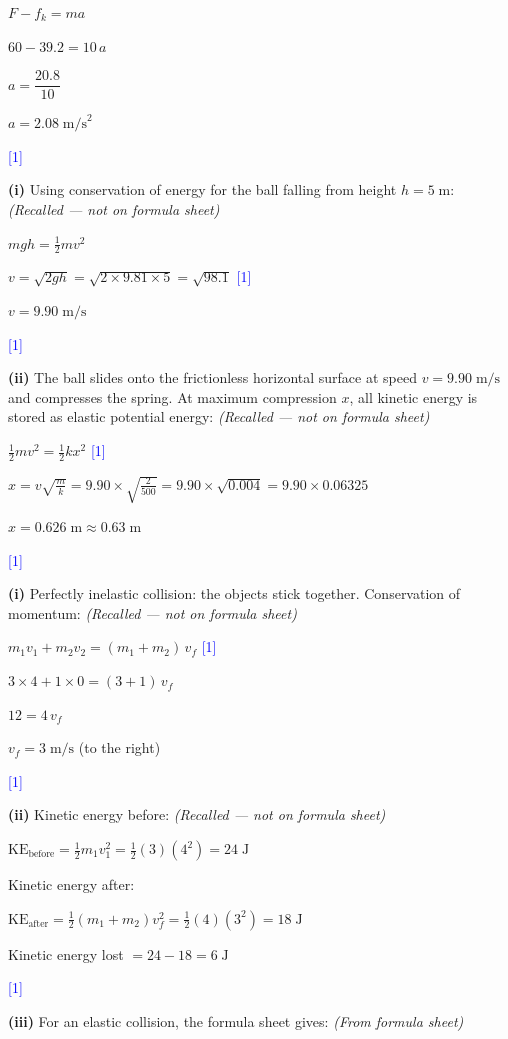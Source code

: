 \documentclass[12pt,a4paper]{article}
\newcommand{\markstep}[1]{\hfill\textcolor{blue}{[#1]}}
\newcommand{\finalanswer}[1]{%
  \begin{tcolorbox}[colback=green!5!white,colframe=green!50!black,boxrule=0.5pt]
  #1
  \end{tcolorbox}
}
\newcommand{\fromsheet}{\textit{(From formula sheet)}}
\newcommand{\recalled}{\textit{(Recalled --- not on formula sheet)}}
\begin{document}
\begin{parts}
$F - f_k = ma$

$60 - 39.2 = 10\,a$

$a = \dfrac{20.8}{10}$

\finalanswer{$a = 2.08\;\text{m/s}^2$} \markstep{1}

\item

\textbf{(i)} Using conservation of energy for the ball falling from height $h = 5\;\text{m}$: \recalled

$mgh = \tfrac{1}{2}mv^2$

$v = \sqrt{2gh} = \sqrt{2\times 9.81\times 5} = \sqrt{98.1}$ \markstep{1}

\finalanswer{$v = 9.90\;\text{m/s}$} \markstep{1}

\textbf{(ii)} The ball slides onto the frictionless horizontal surface at speed $v = 9.90\;\text{m/s}$ and compresses the spring. At maximum compression $x$, all kinetic energy is stored as elastic potential energy: \recalled

$\tfrac{1}{2}mv^2 = \tfrac{1}{2}kx^2$ \markstep{1}

$x = v\sqrt{\frac{m}{k}} = 9.90\times\sqrt{\frac{2}{500}} = 9.90\times\sqrt{0.004} = 9.90\times 0.06325$

\finalanswer{$x = 0.626\;\text{m} \approx 0.63\;\text{m}$} \markstep{1}

\item

\textbf{(i)} Perfectly inelastic collision: the objects stick together. Conservation of momentum: \recalled

$m_1 v_1 + m_2 v_2 = (m_1 + m_2)\,v_f$ \markstep{1}

$3\times 4 + 1\times 0 = (3+1)\,v_f$

$12 = 4\,v_f$

\finalanswer{$v_f = 3\;\text{m/s}$ (to the right)} \markstep{1}

\textbf{(ii)} Kinetic energy before: \recalled

$\text{KE}_{\text{before}} = \tfrac{1}{2}m_1 v_1^2 = \tfrac{1}{2}(3)(4^2) = 24\;\text{J}$

Kinetic energy after:

$\text{KE}_{\text{after}} = \tfrac{1}{2}(m_1+m_2)v_f^2 = \tfrac{1}{2}(4)(3^2) = 18\;\text{J}$

\finalanswer{Kinetic energy lost $= 24 - 18 = 6\;\text{J}$} \markstep{1}

\textbf{(iii)} For an elastic collision, the formula sheet gives: \fromsheet


\end{parts}
\end{document}
